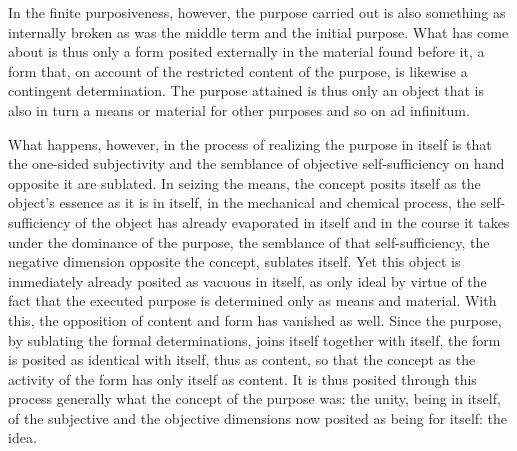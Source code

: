 In the finite purposiveness, however,
the purpose carried out is also
something as internally broken
as was the middle term and the initial purpose.
What has come about is thus only a form
posited externally in the material found before it,
a form that, on account of the restricted content of
the purpose, is likewise a contingent determination.
The purpose attained is thus only an object
that is also in turn a means or material
for other purposes and so on ad infinitum.

What happens, however, in the process of
realizing the purpose in itself is
that the one-sided subjectivity
and the semblance of objective self-sufficiency
on hand opposite it are sublated.
In seizing the means, the concept posits itself
as the object's essence as it is in itself,
in the mechanical and chemical process,
the self-sufficiency of the object
has already evaporated in itself
and in the course it takes under
the dominance of the purpose,
the semblance of that self-sufficiency,
the negative dimension opposite the concept,
sublates itself.
Yet this object is immediately
already posited as vacuous in itself,
as only ideal by virtue of the fact
that the executed purpose is determined
only as means and material.
With this, the opposition of content and form
has vanished as well.
Since the purpose, by sublating the formal determinations,
joins itself together with itself,
the form is posited as identical with itself,
thus as content,
so that the concept as the activity of
the form has only itself as content.
It is thus posited through this process generally
what the concept of the purpose was:
the unity, being in itself,
of the subjective and the objective dimensions
now posited as being for itself:
the idea.
